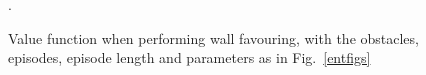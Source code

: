 \documentclass{article}
\begin{document}
\begin{figure}[ht]
\centering
{}
\caption{Value function when performing wall favouring, with the obstacles, episodes, episode length and parameters as in Fig.~\ref{entfigs}}.\label{corvariant}
\end{figure}

\end{document}
